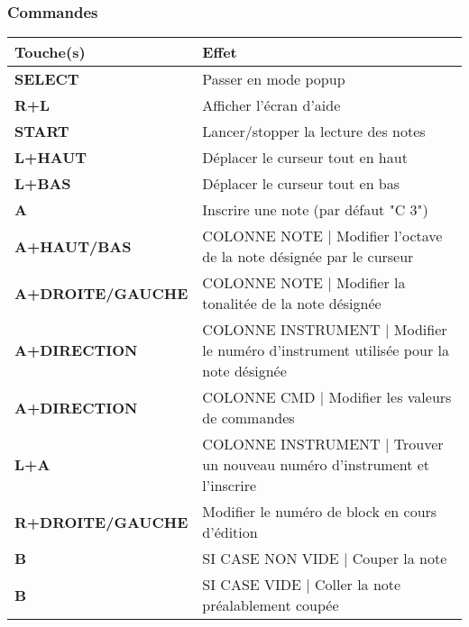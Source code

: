 \subsubsection{Commandes}
\tablelasttail{\hline}
\begin{tabular}{|l|p{11cm}|}
\hline
    \rowcolor{headertab} {\bf Touche(s)} & {\bf Effet} \\
    \hline
    {\bf SELECT} & Passer en mode popup \\
    \hline
    {\bf R+L} & Afficher l'écran d'aide \\
    \hline
    {\bf START} & Lancer/stopper la lecture des notes \\
    \hline
    {\bf L+HAUT} & Déplacer le curseur tout en haut \\
    \hline
    {\bf L+BAS} & Déplacer le curseur tout en bas \\
    \hline
    {\bf A} & Inscrire une note (par défaut "C 3") \\
    \hline
    {\bf A+HAUT/BAS} & COLONNE NOTE | Modifier l'octave de la note désignée par le curseur \\
    \hline
    {\bf A+DROITE/GAUCHE} & COLONNE NOTE | Modifier la tonalitée de la note désignée \\
    \hline
    {\bf A+DIRECTION} & COLONNE INSTRUMENT | Modifier le numéro d'instrument utilisée pour la note désignée \\
    \hline
    {\bf A+DIRECTION} & COLONNE CMD | Modifier les valeurs de commandes \\
    \hline
    {\bf L+A} & COLONNE INSTRUMENT | Trouver un nouveau numéro d'instrument et l'inscrire \\
    \hline
    {\bf R+DROITE/GAUCHE} & Modifier le numéro de block en cours d'édition \\
    \hline
    {\bf B} & SI CASE NON VIDE | Couper la note \\
    \hline
    {\bf B} & SI CASE VIDE | Coller la note préalablement coupée \\
\hline
\end{tabular}
